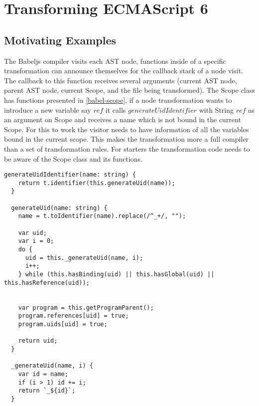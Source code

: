 
\chapter{Transforming ECMAScript 6} %

\label{Chapter3}


\section{Motivating Examples}

The Babeljs compiler visits each AST node, functions inside of a specific transformation can announce themselves for the callback stack of a node visit. The callback to this function receives several arguments (current AST node, parent AST node, current Scope, and the file being transformed). The Scope class has functions presented in \ref{babel-scope}, if a node transformation wants to introduce a new variable say $ref$ it calls $generateUidIdentifier$ with String $ref$ as an argument on Scope and receives a name which is not bound in the current Scope. For this to work the visitor needs to have information of all the variables bound in the current scope. This makes the transformation more a full compiler than a set of transformation rules. For starters the transformation code needs to be aware of the Scope class and its functions. 

\begin{lstlisting}[label=babel-scope, caption={Variable capture avoidance code from babeljs source\protect\footnotemark}]
  generateUidIdentifier(name: string) {
    return t.identifier(this.generateUid(name));
  }

  generateUid(name: string) {
    name = t.toIdentifier(name).replace(/^_+/, "");

    var uid;
    var i = 0;
    do {
      uid = this._generateUid(name, i);
      i++;
    } while (this.hasBinding(uid) || this.hasGlobal(uid) || this.hasReference(uid));


    var program = this.getProgramParent();
    program.references[uid] = true;
    program.uids[uid] = true;

    return uid;
  }

  _generateUid(name, i) {
    var id = name;
    if (i > 1) id += i;
    return `_${id}`;
  }
\end{lstlisting}

